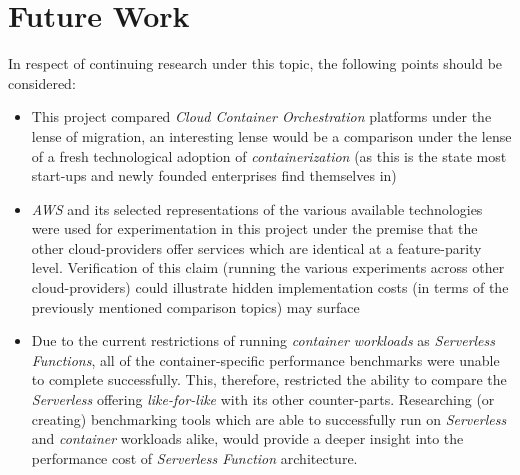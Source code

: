 \section{Future Work}
In respect of continuing research under this topic, the following points should be considered:
\begin{itemize}
  \item This project compared \emph{Cloud Container Orchestration} platforms under the lense of migration,
        an interesting lense would be a comparison under the lense of a fresh technological adoption of \textit{containerization}
        (as this is the state most start-ups and newly founded enterprises find themselves in)
  \item \textit{AWS} and its selected representations of the various available technologies were used for experimentation in this project
        under the premise that the other cloud-providers offer services which are identical at a feature-parity level.
        Verification of this claim (running the various experiments across other cloud-providers) could illustrate hidden implementation costs
        (in terms of the previously mentioned comparison topics) may surface
  \item Due to the current restrictions of running \textit{container workloads} as \textit{Serverless Functions},
        all of the container-specific performance benchmarks were unable to complete successfully.
        This, therefore, restricted the ability to compare the \textit{Serverless} offering \emph{like-for-like} with its other counter-parts.
        Researching (or creating) benchmarking tools which are able to successfully run on \textit{Serverless} and \textit{container} workloads alike,
        would provide a deeper insight into the performance cost of \textit{Serverless Function} architecture.
\end{itemize}

